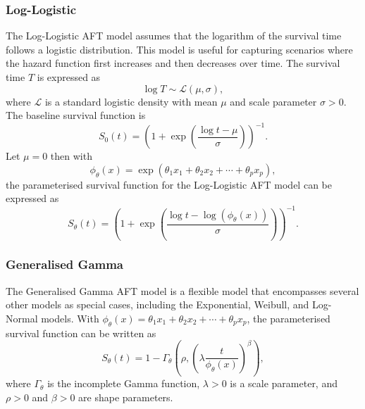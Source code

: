 
\subsubsection{Log-Logistic}
The Log-Logistic AFT model assumes that the logarithm of the survival time follows a logistic distribution. This model is useful for capturing scenarios where the hazard function first increases and then decreases over time. The survival time $T$ is expressed as
$$ %
    \log T \sim \mathcal{L}(\mu, \sigma),
$$
where $\mathcal{L}$ is a standard logistic density with mean $\mu$
and scale parameter $\sigma > 0$.  The baseline survival function is
$$ %
    S_0(t) = \left(1 + \exp\left( \frac{\log t - \mu}{\sigma} \right)\right) ^{-1}.
$$
Let $\mu=0$ then with
$$
    \phi_\theta(x) = \exp(\theta_1 x_1 + \theta_2 x_2 + \cdots + \theta_p x_p),
$$
the parameterised survival function for the Log-Logistic AFT model can be expressed as
$$ %
    S_{\theta}(t) = \left( 1 + \exp \left( \frac{\log t - \log(\phi_\theta(x))}{\sigma}\right) \right)^{-1}.
$$


\subsubsection{Generalised Gamma}
The Generalised Gamma AFT model is a flexible model that encompasses several other models as special cases, including the Exponential, Weibull, and Log-Normal models.
With $\phi_{\theta}(x) = \theta_1 x_1 + \theta_2 x_2 + \cdots + \theta_p x_p$, the parameterised survival function can be written as
$$
    S_{\theta}(t) = 1 - \Gamma_{\theta}\left(\rho, \left(\lambda \frac{t}{\phi_\theta(x)}\right)^\beta\right),
$$
where $\Gamma_{\theta}$ is the incomplete Gamma function, $\lambda > 0$ is a scale parameter, and $\rho>0$ and $\beta > 0$ are shape parameters.

